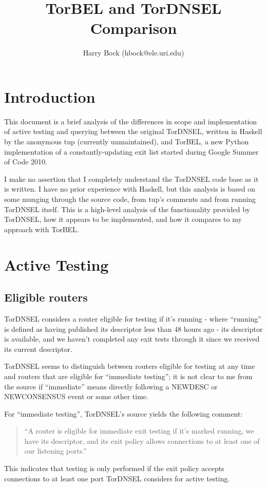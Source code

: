 \documentclass{article}
\begin{document}
\title{TorBEL and TorDNSEL Comparison}
\author{Harry Bock (hbock@ele.uri.edu)}
\maketitle

\section{Introduction}
This document is a brief analysis of the differences in scope and
implementation of active testing and querying between the original
TorDNSEL, written in Haskell by the anonymous tup (currently
unmaintained), and TorBEL, a new Python implementation of a
constantly-updating exit list started during Google Summer of Code
2010.

I make no assertion that I completely understand the TorDNSEL code
base as it is written.  I have no prior experience with Haskell, but
this analysis is based on some munging through the source code,
from tup's comments and from running TorDNSEL itself.  This is a
high-level analysis of the functionality provided by TorDNSEL,
how it appears to be implemented, and how it compares to my
approach with TorBEL.

\section{Active Testing}
\subsection{Eligible routers}

TorDNSEL considers a router eligible for testing if it's running -
where ``running'' is defined as having published its descriptor less
than 48 hours ago - its descriptor is available, and we haven't
completed any exit tests through it since we received its current
descriptor.

TorDNSEL seems to distinguish between routers eligible for testing at
any time and routers that are eligible for ``immediate testing''; it
is not clear to me from the source if ``immediate'' means directly
following a NEWDESC or NEWCONSENSUS event or some other time.

For ``immediate testing'', TorDNSEL's source yields the following comment:
\begin{quote}
``A router is eligible 
for immediate exit testing if it's marked running, we have its
descriptor, and its exit policy allows connections to at least one of
our listening ports.''
\end{quote}
This indicates that testing is only performed if the exit policy accepts
connections to at least one port TorDNSEL considers for active testing.
\end{document}
